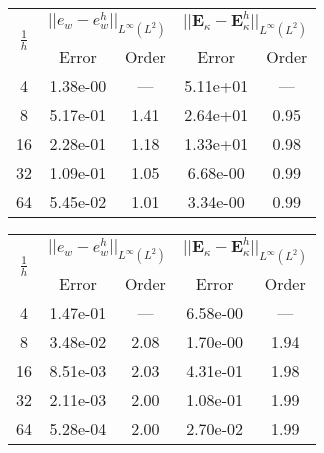 \begin{table}[hp]
	\centering
	\begin{tabular}{ccccc}
		\hline 
		\multirow{2}{*}{$\frac{1}{h}$} & \multicolumn{2}{c}{$||e_w - e_w^h||_{L^{\infty}(L^2)}$}  & \multicolumn{2}{c}{$||\bm{E}_\kappa - \bm{E}_\kappa^h||_{L^{\infty}(L^2)}$}   \\ 
		& Error & Order  & Error & Order  \\
		\hline 
		4  & 1.38e-00 & ---  & 5.11e+01 & ---  \\ 
		8  & 5.17e-01 & 1.41 & 2.64e+01 & 0.95 \\ 
		16 & 2.28e-01 & 1.18 & 1.33e+01 & 0.98 \\ 
		32 & 1.09e-01 & 1.05 & 6.68e-00 & 0.99 \\ 
		64 & 5.45e-02 & 1.01 & 3.34e-00 & 0.99 \\ 
		\hline 
	\end{tabular} 
	\captionsetup{width=0.95\linewidth}
	\vspace{1mm}
	\label{tab:resminHHJ_SSSS_k1}
\end{table}

\begin{table}[hp]
	\centering
	\begin{tabular}{ccccc}
		\hline 
		\multirow{2}{*}{$\frac{1}{h}$} & \multicolumn{2}{c}{$||e_w - e_w^h||_{L^{\infty}(L^2)}$}  & \multicolumn{2}{c}{$||\bm{E}_\kappa - \bm{E}_\kappa^h||_{L^{\infty}(L^2)}$}   \\ 
		& Error & Order  & Error & Order  \\
		\hline 
		4  & 1.47e-01 & ---  & 6.58e-00 & ---  \\ 
		8  & 3.48e-02 & 2.08 & 1.70e-00 & 1.94 \\ 
		16 & 8.51e-03 & 2.03 & 4.31e-01 & 1.98 \\ 
		32 & 2.11e-03 & 2.00 & 1.08e-01 & 1.99 \\ 
		64 & 5.28e-04 & 2.00 & 2.70e-02 & 1.99 \\ 
		\hline 
	\end{tabular} 
	\captionsetup{width=0.95\linewidth}
	\vspace{1mm}
	\label{tab:resminHHJ_SSSS_k2}
\end{table}

